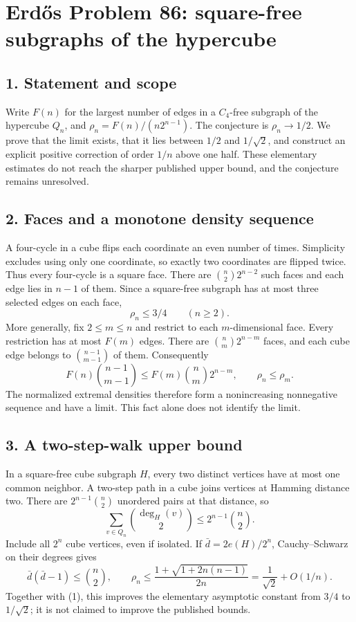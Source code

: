 \section*{Erd\H{o}s Problem 86: square-free subgraphs of the hypercube}

\subsection*{1. Statement and scope}
Write $F(n)$ for the largest number of edges in a $C_4$-free subgraph of the hypercube $Q_n$, and $\rho_n=F(n)/(n2^{n-1})$. The conjecture is $\rho_n\to1/2$. We prove that the limit exists, that it lies between $1/2$ and $1/\sqrt2$, and construct an explicit positive correction of order $1/n$ above one half. These elementary estimates do not reach the sharper published upper bound, and the conjecture remains unresolved.

\subsection*{2. Faces and a monotone density sequence}
A four-cycle in a cube flips each coordinate an even number of times. Simplicity excludes using only one coordinate, so exactly two coordinates are flipped twice. Thus every four-cycle is a square face. There are $\binom n2 2^{n-2}$ such faces and each edge lies in $n-1$ of them. Since a square-free subgraph has at most three selected edges on each face,
\[
 \rho_n\le3/4\qquad(n\ge2).\tag{1}
\]
More generally, fix $2\le m\le n$ and restrict to each $m$-dimensional face. Every restriction has at most $F(m)$ edges. There are $\binom nm2^{n-m}$ faces, and each cube edge belongs to $\binom{n-1}{m-1}$ of them. Consequently
\[
 F(n)\binom{n-1}{m-1}\le F(m)\binom nm2^{n-m},
 \qquad\rho_n\le\rho_m.\tag{2}
\]
The normalized extremal densities therefore form a nonincreasing nonnegative sequence and have a limit. This fact alone does not identify the limit.

\subsection*{3. A two-step-walk upper bound}
In a square-free cube subgraph $H$, every two distinct vertices have at most one common neighbor. A two-step path in a cube joins vertices at Hamming distance two. There are $2^{n-1}\binom n2$ unordered pairs at that distance, so
\[
 \sum_{v\in Q_n}\binom{\deg_H(v)}2\le2^{n-1}\binom n2.
\]
Include all $2^n$ cube vertices, even if isolated. If $\bar d=2e(H)/2^n$, Cauchy--Schwarz on their degrees gives
\[
 \bar d(\bar d-1)\le\binom n2,
 \qquad
 \rho_n\le\frac{1+\sqrt{1+2n(n-1)}}{2n}
 =\frac1{\sqrt2}+O(1/n).\tag{3}
\]
Together with (1), this improves the elementary asymptotic constant from $3/4$ to $1/\sqrt2$; it is not claimed to improve the published bounds.

